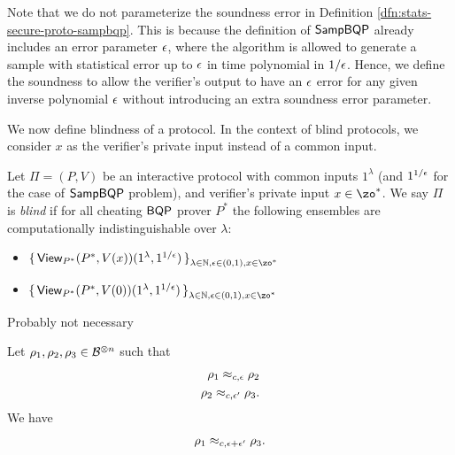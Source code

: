 \begin{remark} Note that we do not parameterize the soundness error in Definition \ref{dfn:stats-secure-proto-sampbqp}. This is because the definition of $\operatorname{\mathsf{SampBQP}}$ already includes an error parameter $\epsilon$, where the algorithm is allowed to generate a sample with statistical error up to $\epsilon$ in time polynomial in $1/\epsilon$. Hence, we define the soundness to  allow the verifier's output to have an $\epsilon$ error for any given inverse polynomial $\epsilon$ without introducing an extra soundness error parameter.
\end{remark}

We now define blindness of a protocol.
In the context of blind protocols, we consider $x$ as the verifier's private input instead of a common input.  


\begin{definition}[Blindness]
    Let $\Pi=(P, V)$ be an interactive protocol with common inputs $1^\lambda$ (and $1^{1/\epsilon}$ for the case of $\operatorname{\mathsf{SampBQP}}$ problem), and verifier's private input $x\in\zo^*$.
    We say $\Pi$ is \emph{blind} if for all cheating $\operatorname{\mathsf{BQP}}$ prover $P^*$ the following ensembles are computationally indistinguishable over $\lambda$:
    \begin{itemize}
        \item $\set{\View_{P^*}(P^*, V(x))(1^\lambda, 1^{1/\eps})}_{\lambda\in\bbN, \eps\in(0,1), x\in\zo^*}$
        \item $\set{\View_{P^*}(P^*, V(0))(1^\lambda, 1^{1/\eps})}_{\lambda\in\bbN, \eps\in(0,1), x\in\zo^*}$
    \end{itemize}
\end{definition}


\iffalse

Probably not necessary

\begin{lem} \label{lem:computational-triangle0}
    Let $\rho_1, \rho_2, \rho_3\in\mathcal{B}^{\otimes n}$ such that
    \begin{align}
        \rho_1\approx_{c, \epsilon}\rho_2\\
        \rho_2\approx_{c, \epsilon'}\rho_3.
    \end{align}
    We have
    \begin{align}
        \rho_1\approx_{c, \epsilon+\epsilon'}\rho_3.
    \end{align}
\end{lem}

